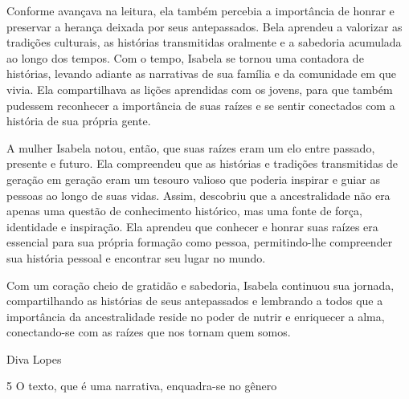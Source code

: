 \begin{escolha}
\begin{escolha}
\begin{escolha}
\begin{escolha}
\begin{escolha}
\begin{escolha}
\begin{escolha}
Conforme avançava na leitura, ela também percebia a importância de
honrar e preservar a herança deixada por seus antepassados. Bela
aprendeu a valorizar as tradições culturais, as histórias transmitidas
oralmente e a sabedoria acumulada ao longo dos tempos. Com o tempo,
Isabela se tornou uma contadora de histórias, levando adiante as
narrativas de sua família e da comunidade em que vivia. Ela
compartilhava as lições aprendidas com os jovens, para que também
pudessem reconhecer a importância de suas raízes e se sentir conectados
com a história de sua própria gente.

A mulher Isabela notou, então, que suas raízes eram um elo entre
passado, presente e futuro. Ela compreendeu que as histórias e tradições
transmitidas de geração em geração eram um tesouro valioso que poderia
inspirar e guiar as pessoas ao longo de suas vidas. Assim, descobriu que
a ancestralidade não era apenas uma questão de conhecimento histórico,
mas uma fonte de força, identidade e inspiração. Ela aprendeu que
conhecer e honrar suas raízes era essencial para sua própria formação
como pessoa, permitindo-lhe compreender sua história pessoal e encontrar
seu lugar no mundo.

Com um coração cheio de gratidão e sabedoria, Isabela continuou sua
jornada, compartilhando as histórias de seus antepassados e lembrando a
todos que a importância da ancestralidade reside no poder de nutrir e
enriquecer a alma, conectando-se com as raízes que nos tornam quem
somos.

Diva Lopes

\num{5} O texto, que é uma narrativa, enquadra-se no gênero

\end{escolha}
\end{escolha}
\end{escolha}
\end{escolha}
\end{escolha}
\end{escolha}
\end{escolha}
